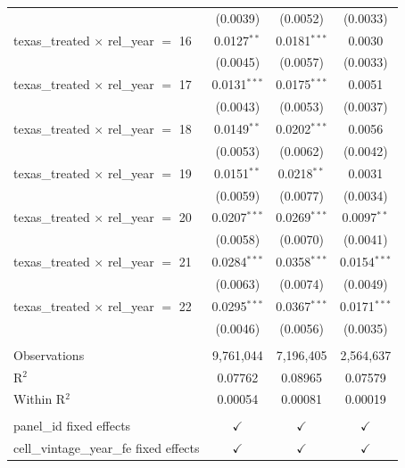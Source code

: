 \begin{tabular}{lccc}
                                                & (0.0039)       & (0.0052)       & (0.0033)\\   
   texas\_treated $\times$ rel\_year $=$ 16     & 0.0127$^{**}$  & 0.0181$^{***}$ & 0.0030\\   
                                                & (0.0045)       & (0.0057)       & (0.0033)\\   
   texas\_treated $\times$ rel\_year $=$ 17     & 0.0131$^{***}$ & 0.0175$^{***}$ & 0.0051\\   
                                                & (0.0043)       & (0.0053)       & (0.0037)\\   
   texas\_treated $\times$ rel\_year $=$ 18     & 0.0149$^{**}$  & 0.0202$^{***}$ & 0.0056\\   
                                                & (0.0053)       & (0.0062)       & (0.0042)\\   
   texas\_treated $\times$ rel\_year $=$ 19     & 0.0151$^{**}$  & 0.0218$^{**}$  & 0.0031\\   
                                                & (0.0059)       & (0.0077)       & (0.0034)\\   
   texas\_treated $\times$ rel\_year $=$ 20     & 0.0207$^{***}$ & 0.0269$^{***}$ & 0.0097$^{**}$\\   
                                                & (0.0058)       & (0.0070)       & (0.0041)\\   
   texas\_treated $\times$ rel\_year $=$ 21     & 0.0284$^{***}$ & 0.0358$^{***}$ & 0.0154$^{***}$\\   
                                                & (0.0063)       & (0.0074)       & (0.0049)\\   
   texas\_treated $\times$ rel\_year $=$ 22     & 0.0295$^{***}$ & 0.0367$^{***}$ & 0.0171$^{***}$\\   
                                                & (0.0046)       & (0.0056)       & (0.0035)\\   
    \\
   Observations                                 & 9,761,044      & 7,196,405      & 2,564,637\\  
   R$^2$                                        & 0.07762        & 0.08965        & 0.07579\\  
   Within R$^2$                                 & 0.00054        & 0.00081        & 0.00019\\  
    \\
   panel\_id fixed effects                      & $\checkmark$   & $\checkmark$   & $\checkmark$\\   
   cell\_vintage\_year\_fe fixed effects        & $\checkmark$   & $\checkmark$   & $\checkmark$\\   
   \bottomrule
\end{tabular}
\par\endgroup


